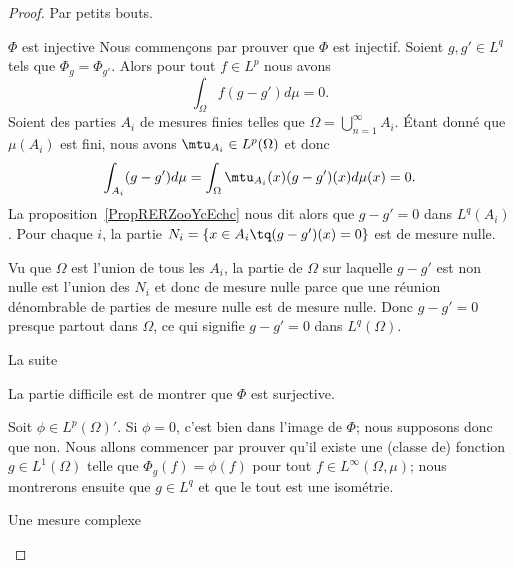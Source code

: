 \begin{proof}
    Par petits bouts.
    \begin{subproof}
        \item[\( \Phi\) est injective]
        Nous commençons par prouver que \( \Phi\) est injectif. Soient \( g,g'\in L^q\) tels que \( \Phi_g=\Phi_{g'}\). Alors pour tout \( f\in L^p\) nous avons
                \begin{equation}
                    \int_{\Omega}f(g-g')d\mu=0.
                \end{equation}
                Soient des parties \( A_i\) de mesures finies telles que \( \Omega=\bigcup_{n=1}^{\infty}A_i\). Étant donné que \( \mu(A_i)\) est fini, nous avons \( \mtu_{A_i}\in L^p(\Omega)\) et donc
                \begin{equation}
                    \int_{A_i}(g-g')d\mu=\int_{\Omega}\mtu_{A_i}(x)(g-g')(x)d\mu(x)=0.
                \end{equation}
                La proposition~\ref{PropRERZooYcEchc} nous dit alors que \( g-g'=0\) dans \( L^q(A_i)\). Pour chaque \( i\), la partie \( N_i=\{ x\in A_i\tq (g-g')(x)=0 \}\) est de mesure nulle.

                Vu que \( \Omega\) est l'union de tous les \( A_i\), la partie de \( \Omega\) sur laquelle \( g-g'\) est non nulle est l'union des \( N_i\) et donc de mesure nulle parce que une réunion dénombrable de parties de mesure nulle est de mesure nulle. Donc \( g-g'=0\) presque partout dans \( \Omega\), ce qui signifie \( g-g'=0\) dans \( L^q(\Omega)\).

            \item[La suite]

        La partie difficile est de montrer que \( \Phi\) est surjective.

        Soit \( \phi\in L^p(\Omega)'\). Si \( \phi=0\), c'est bien dans l'image de \( \Phi\); nous supposons donc que non. Nous allons commencer par prouver qu'il existe une (classe de) fonction \( g\in L^1(\Omega)\) telle que \( \Phi_g(f)=\phi(f)\) pour tout \(f\in L^{\infty}(\Omega,\mu)\); nous montrerons ensuite que \( g\in L^q\) et que le tout est une isométrie.

        \item[Une mesure complexe]


\end{subproof}
\end{proof}

